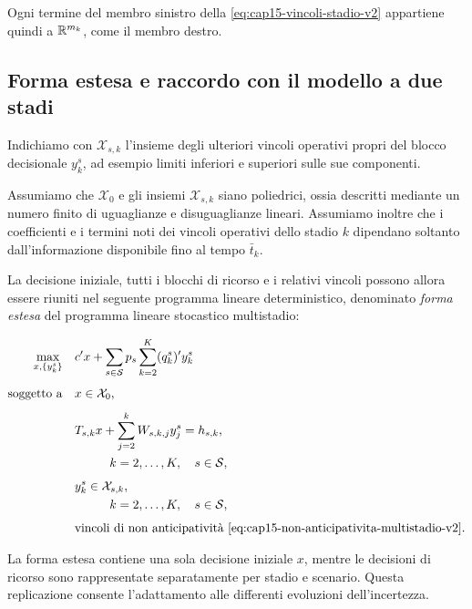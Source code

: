 Ogni termine del membro sinistro
della \eqref{eq:cap15-vincoli-stadio-v2}
appartiene quindi a $\mathbb{R}^{m_k}$,
come il membro destro.



\subsection{Forma estesa e raccordo
con il modello a due stadi}

Indichiamo con $\mathcal X_{s,k}$
l'insieme degli ulteriori vincoli
operativi propri del blocco
decisionale $y_k^s$, ad esempio
limiti inferiori e superiori
sulle sue componenti.

Assumiamo che $\mathcal X_0$
e gli insiemi $\mathcal X_{s,k}$
siano poliedrici, ossia descritti
mediante un numero finito di
uguaglianze e disuguaglianze
lineari. Assumiamo inoltre che i coefficienti
e i termini noti dei vincoli operativi
dello stadio $k$ dipendano soltanto
dall'informazione disponibile fino
al tempo $\bar t_k$.

La decisione iniziale,
tutti i blocchi di ricorso
e i relativi vincoli possono
allora essere riuniti
nel seguente programma
lineare deterministico,
denominato \emph{forma estesa}
del programma lineare
stocastico multistadio:

\begin{equation}
\begin{aligned}
\max_{x,\{y_k^s\}}
\quad&
c'x+
\sum_{s\in\mathcal S}p_s
\sum_{k=2}^{K}(q_k^s)'y_k^s
\\[4pt]
\text{soggetto a}\quad&
x\in\mathcal X_0,
\\[4pt]
&
T_{s,k}x+
\sum_{j=2}^{k}W_{s,k,j}y_j^s
=h_{s,k},
\\
&
\hspace{1cm}
k=2,\ldots,K,\quad s\in\mathcal S,
\\[4pt]
&
y_k^s\in\mathcal X_{s,k},
\\
&
\hspace{1cm}
k=2,\ldots,K,\quad s\in\mathcal S,
\\[4pt]
&
\text{vincoli di non anticipativit\`a
\eqref{eq:cap15-non-anticipativita-multistadio-v2}.}
\end{aligned}
\label{eq:cap15-forma-estesa-multistadio-v2}
\end{equation}

La forma estesa contiene
una sola decisione iniziale $x$,
mentre le decisioni di ricorso
sono rappresentate separatamente
per stadio e scenario.
Questa replicazione consente
l'adattamento alle differenti
evoluzioni dell'incertezza.


